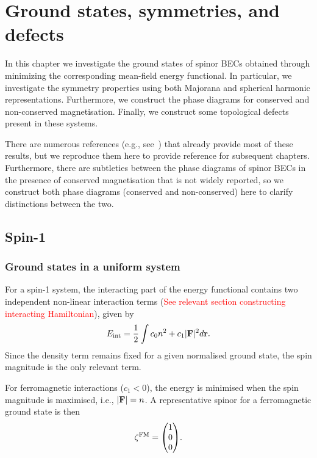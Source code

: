 \chapter{Ground states, symmetries, and defects}\label{chap: ground-states}
In this chapter we investigate the ground states of spinor BECs obtained through
minimizing the corresponding mean-field energy functional.
In particular, we investigate the symmetry properties using both Majorana and
spherical harmonic representations.
Furthermore, we construct the phase diagrams for conserved and non-conserved
magnetisation.
Finally, we construct some topological defects present in these systems.

There are numerous references (e.g., see~\cite{Ciobanu2000, Zhang2003,
    Kawaguchi2012, StamperKurn2013}) that already provide most of these results,
but we reproduce them here to provide reference for subsequent chapters.
Furthermore, there are subtleties between the phase diagrams of spinor BECs
in the presence of conserved magnetisation that is not widely reported, so we
construct both phase diagrams (conserved and non-conserved) here to clarify
distinctions between the two.


\section{Spin-1}\label{sec: ground-states-spin-1}

\subsection{Ground states in a uniform system}

For a spin-1 system, the interacting part of the energy functional contains
two independent non-linear interaction terms (\textcolor{red}{See relevant
    section constructing interacting Hamiltonian}), given by
\begin{equation}
    E_\mathrm{int} = \frac{1}{2}\int c_0n^2+c_1|\vb{F}|^2 d\vb{r}.
\end{equation}
Since the density term remains fixed for a given normalised ground state, the
spin magnitude is the only relevant term.

For ferromagnetic interactions (\(c_1 < 0 \)), the energy is minimised when
the spin magnitude is maximised, i.e., \(|\vb{F}| = n\).
A representative spinor for a ferromagnetic ground state is then
\begin{equation}
    \zeta^\mathrm{FM} = \mqty(1 \\ 0 \\ 0).
\end{equation}

